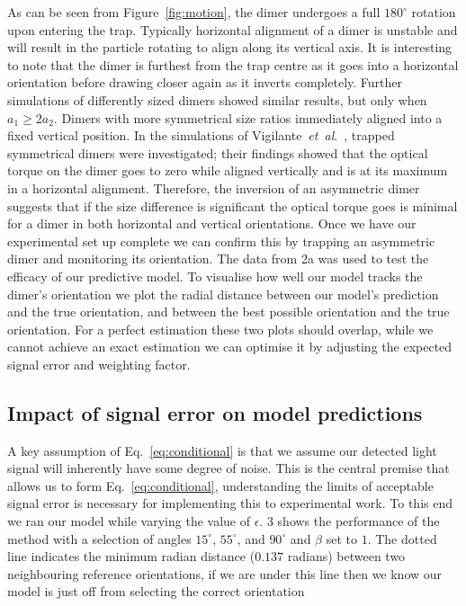 \documentclass[final, 3p]{elsarticle}
\begin{document}
As can be seen from Figure~\ref{fig:motion}, the dimer undergoes a
full $180^{\circ}$ rotation upon entering the trap.  Typically
horizontal alignment of a dimer is unstable and will result in the
particle rotating to align along its vertical axis.  It is interesting
to note that the dimer is furthest from the trap centre as it goes
into a horizontal orientation before drawing closer again as it
inverts completely. Further simulations of differently sized dimers
showed similar results, but only when $a_1 \geq 2a_2$.  Dimers with
more symmetrical size ratios immediately aligned into a fixed vertical
position.
%
In the simulations of Vigilante~\emph{et~al}.\
\cite{Vigilante2020Brownian_OT}, trapped symmetrical dimers were
investigated; their findings showed that the optical torque on the
dimer goes to zero while aligned vertically and is at its maximum in a
horizontal alignment.  Therefore, the inversion of an asymmetric dimer
suggests that if the size difference is significant the optical torque
goes is minimal for a dimer in both horizontal and vertical
orientations. Once we have our experimental set up complete we can
confirm this by trapping an asymmetric dimer and monitoring its
orientation.  The data from \figurename{ 2a} was used to test the
efficacy of our predictive model.  To visualise how well our model
tracks the dimer's orientation we plot the radial distance between our
model's prediction and the true orientation, and between the best
possible orientation and the true orientation.  For a perfect
estimation these two plots should overlap, while we cannot achieve an
exact estimation we can optimise it by adjusting the expected signal
error and weighting factor.


\subsection{Impact of signal error on model predictions}
\label{sec:epsilon}

A key assumption of Eq.~\eqref{eq:conditional} is that we assume our
detected light signal will inherently have some degree of noise. This
is the central premise that allows us to form
Eq.~\eqref{eq:conditional}, understanding the limits of acceptable
signal error is necessary for implementing this to experimental work.
To this end we ran our model while varying the value of $\epsilon$.
\figurename{ 3} shows the performance of the method with a selection
of angles $15^{\circ}$, $55^{\circ}$, and $90^{\circ}$ and $\beta$ set
to $1$.  The dotted line indicates the minimum radian distance
($0.137$ radians) between two neighbouring reference orientations, if
we are under this line then we know our model is just off from
selecting the correct orientation
\end{document}

